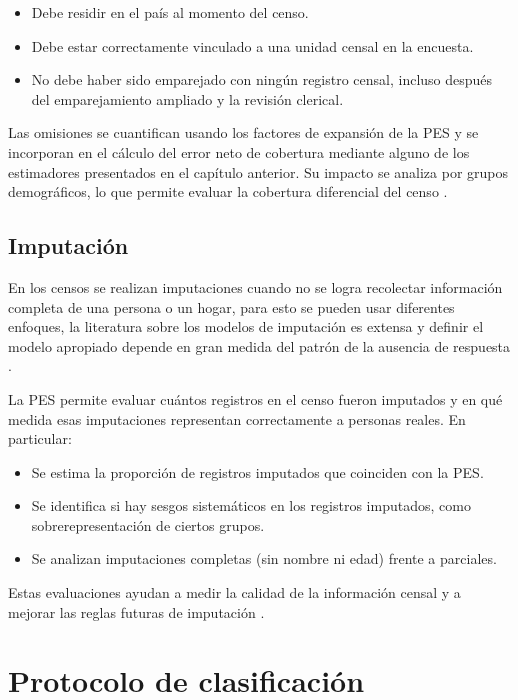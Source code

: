 \documentclass[
  12pt,
]{book}
\providecommand{\tightlist}{%
  \setlength{\itemsep}{0pt}\setlength{\parskip}{0pt}}
\begin{document}
\begin{itemize}
\tightlist
\item
  Debe residir en el país al momento del censo.
\item
  Debe estar correctamente vinculado a una unidad censal en la encuesta.
\item
  No debe haber sido emparejado con ningún registro censal, incluso después del emparejamiento ampliado y la revisión clerical.
\end{itemize}

Las omisiones se cuantifican usando los factores de expansión de la PES y se incorporan en el cálculo del error neto de cobertura mediante alguno de los estimadores presentados en el capítulo anterior. Su impacto se analiza por grupos demográficos, lo que permite evaluar la cobertura diferencial del censo \citep{wolter1986coverage, USCensusBureau_2022}.

\subsection{Imputación}\label{imputaciuxf3n}

En los censos se realizan imputaciones cuando no se logra recolectar información completa de una persona o un hogar, para esto se pueden usar diferentes enfoques, la literatura sobre los modelos de imputación es extensa y definir el modelo apropiado depende en gran medida del patrón de la ausencia de respuesta \citep{van2012flexible}.

La PES permite evaluar cuántos registros en el censo fueron imputados y en qué medida esas imputaciones representan correctamente a personas reales. En particular:

\begin{itemize}
\tightlist
\item
  Se estima la proporción de registros imputados que coinciden con la PES.
\item
  Se identifica si hay sesgos sistemáticos en los registros imputados, como sobrerepresentación de ciertos grupos.
\item
  Se analizan imputaciones completas (sin nombre ni edad) frente a parciales.
\end{itemize}

Estas evaluaciones ayudan a medir la calidad de la información censal y a mejorar las reglas futuras de imputación \citep{biemer2003introduction, USCensusBureau_2022}.

\section{Protocolo de clasificación}\label{protocolo-de-clasificaciuxf3n}
\end{document}
